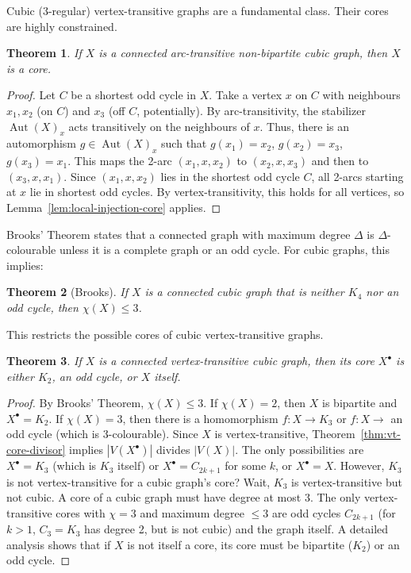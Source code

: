 \documentclass[12pt,a4paper,openany]{book}
\newtheorem{theorem}{Theorem}[section]
\begin{document}
Cubic (3-regular) vertex-transitive graphs are a fundamental class. Their cores are highly constrained.

\begin{theorem}\label{thm:cubic-arc-transitive-core}
If $X$ is a connected arc-transitive non-bipartite cubic graph, then $X$ is a core.
\end{theorem}
\begin{proof}
Let $C$ be a shortest odd cycle in $X$. Take a vertex $x$ on $C$ with neighbours $x_1, x_2$ (on $C$) and $x_3$ (off $C$, potentially). By arc-transitivity, the stabilizer $\operatorname{Aut}(X)_x$ acts transitively on the neighbours of $x$. Thus, there is an automorphism $g \in \operatorname{Aut}(X)_x$ such that $g(x_1)=x_2$, $g(x_2)=x_3$, $g(x_3)=x_1$. This maps the 2-arc $(x_1, x, x_2)$ to $(x_2, x, x_3)$ and then to $(x_3, x, x_1)$. Since $(x_1, x, x_2)$ lies in the shortest odd cycle $C$, all 2-arcs starting at $x$ lie in shortest odd cycles. By vertex-transitivity, this holds for all vertices, so Lemma~\ref{lem:local-injection-core} applies.
\end{proof}

Brooks' Theorem states that a connected graph with maximum degree $\Delta$ is $\Delta$-colourable unless it is a complete graph or an odd cycle. For cubic graphs, this implies:

\begin{theorem}[Brooks]
If $X$ is a connected cubic graph that is neither $K_4$ nor an odd cycle, then $\chi(X) \leq 3$.
\end{theorem}

This restricts the possible cores of cubic vertex-transitive graphs.

\begin{theorem}\label{thm:cubic-vt-core-classification}
If $X$ is a connected vertex-transitive cubic graph, then its core $X^\bullet$ is either $K_2$, an odd cycle, or $X$ itself.
\end{theorem}
\begin{proof}
By Brooks' Theorem, $\chi(X) \leq 3$. If $\chi(X)=2$, then $X$ is bipartite and $X^\bullet = K_2$. If $\chi(X)=3$, then there is a homomorphism $f: X \to K_3$ or $f: X \to $ an odd cycle (which is 3-colourable). Since $X$ is vertex-transitive, Theorem~\ref{thm:vt-core-divisor} implies $|V(X^\bullet)|$ divides $|V(X)|$. The only possibilities are $X^\bullet = K_3$ (which is $K_3$ itself) or $X^\bullet = C_{2k+1}$ for some $k$, or $X^\bullet = X$. However, $K_3$ is not vertex-transitive for a cubic graph's core? Wait, $K_3$ is vertex-transitive but not cubic. A core of a cubic graph must have degree at most 3. The only vertex-transitive cores with $\chi=3$ and maximum degree $\leq 3$ are odd cycles $C_{2k+1}$ (for $k>1$, $C_3=K_3$ has degree 2, but is not cubic) and the graph itself. A detailed analysis shows that if $X$ is not itself a core, its core must be bipartite ($K_2$) or an odd cycle.
\end{proof}
\end{document}
